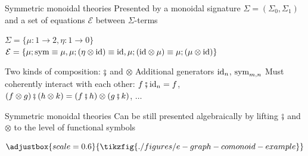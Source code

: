 \documentclass[aspectratio=169]{beamer}
\begin{document}
\begin{frame}{Symmetric monoidal theories}
    Presented by a \alert{monoidal signature} $\Sigma = (\Sigma_0, \Sigma_1)$ and a set of \alert{equations} $\mathcal{E}$ between $\Sigma$-terms
    \vfill
    \begin{example}
    \vfill
    $\Sigma = \{ \mu : 1 \to 2, \eta : 1 \to 0\}$
    \vfill
    $\mathcal{E} = \{\mu;\operatorname{sym} \equiv \mu, \mu;(\eta \otimes \mathrm{id}) \equiv \mathrm{id}, \mu;(\mathrm{id} \otimes \mu) \equiv \mu;(\mu \otimes \mathrm{id})\}$
    \vfill
    \end{example}
    \vfill
    Two kinds of composition: $\fatsemi$ and $\otimes$
    \vfill
    Additional generators $\operatorname{id}_n$, $\operatorname{sym}_{m,n}$
    \vfill
    Must coherently interact with each other: $f \fatsemi \operatorname{id}_n = f$, $(f \otimes g) \fatsemi (h \otimes k) = (f \fatsemi h) \otimes (g \fatsemi k)$, $\ldots$
\end{frame}

\begin{frame}{Symmetric monoidal theories}
    Can be still presented algebraically by lifting $\fatsemi$ and $\otimes$ to the level of functional symbols
    \vfill
    \begin{example}[$((\mu \fatsemi \sym) \otimes (\eta \otimes \id)) \otimes (\mu \fatsemi (\id \otimes \id))$]
    \vfill
\[    
\adjustbox{scale=0.6}{\tikzfig{./figures/e-graph-comonoid-example}}
\]
    \end{example}
\end{frame}
\end{document}
